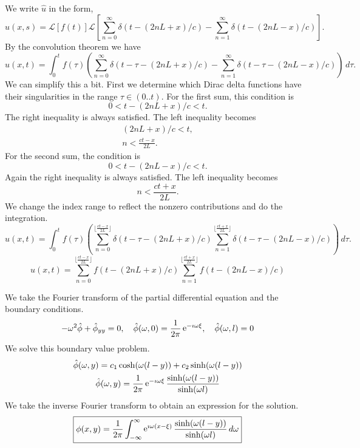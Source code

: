 {\begin{Solution}
\[  \]
  We write $\hat{u}$ in the form,
  \[
  \hat{u}(x,s) = \mathcal{L}[f(t)]
  \mathcal{L} \left[ \sum_{n = 0}^\infty \delta( t - (2 n L + x)/c)
    - \sum_{n = 1}^\infty \delta( t - (2 n L - x)/c) \right].
  \]
  By the convolution theorem we have
  \[
  u(x,t) = \int_0^t f(\tau) \left(
    \sum_{n = 0}^\infty \delta( t - \tau - (2 n L + x)/c)
    - \sum_{n = 1}^\infty \delta( t - \tau - (2 n L - x)/c) \right) \,d \tau.
  \]
  We can simplify this a bit.  First we determine which Dirac delta functions 
  have their singularities in the range $\tau \in (0..t)$.  For the first 
  sum, this condition is
  \[
  0 < t - (2 n L + x) / c < t.
  \]
  The right inequality is always satisfied.  The left inequality becomes
  \begin{gather*}
    (2 n L + x) / c < t, \\
    n < \frac{c t - x}{2 L}.
  \end{gather*}
  For the second sum, the condition is
  \[
  0 < t - (2 n L - x) / c < t.
  \]
  Again the right inequality is always satisfied.  The left inequality becomes
  \[
  n < \frac{c t + x}{2 L}.
  \]
  We change the index range to reflect the nonzero contributions and do the 
  integration.
  \[
  u(x,t) = \int_0^t f(\tau) \left(
    \sum_{n=0}^{\lfloor \frac{c t - x}{2 L} \rfloor} 
    \delta( t - \tau - (2 n L + x)/c)
    \sum_{n=1}^{\lfloor \frac{c t + x}{2 L} \rfloor} 
    \delta( t - \tau - (2 n L - x)/c) \right) \,d \tau.
  \]
  \[
  \boxed{
    u(x,t) = \sum_{n=0}^{\lfloor \frac{c t - x}{2 L} \rfloor} 
    f( t - (2 n L + x)/c)
    \sum_{n=1}^{\lfloor \frac{c t + x}{2 L} \rfloor} 
    f( t - (2 n L - x)/c) 
    }
  \]
\end{Solution}










\begin{Solution}
  We take the Fourier transform of the partial differential equation and
  the boundary conditions. 
  \[
  - \omega^2 \hat{\phi} + \hat{\phi}_{y y} = 0, \quad
  \hat{\phi}(\omega,0) = \frac{1}{2 \pi} \mathop{\mathrm{e}}\nolimits^{- \imath \omega \xi}, 
  \quad \hat{\phi}(\omega,l) = 0
  \]
  We solve this boundary value problem.
  \begin{gather*}
    \hat{\phi}(\omega,y) = c_1 \cosh(\omega(l - y)) + c_2 \sinh(\omega(l - y)) \\
    \hat{\phi}(\omega,y) = \frac{1}{2 \pi} \mathop{\mathrm{e}}\nolimits^{- \imath \omega \xi}
    \frac{ \sinh(\omega(l - y)) }{ \sinh(\omega l) }
  \end{gather*}
  We take the inverse Fourier transform to obtain an expression for the
  solution.
  \[
  \boxed{
    \phi(x,y) = \frac{1}{2 \pi} \int_{-\infty}^\infty \mathop{\mathrm{e}}\nolimits^{\imath \omega (x - \xi)}
    \frac{ \sinh(\omega(l - y)) }{ \sinh(\omega l) } \,d \omega
    }
  \]
\end{Solution}








\raggedbottom
}
